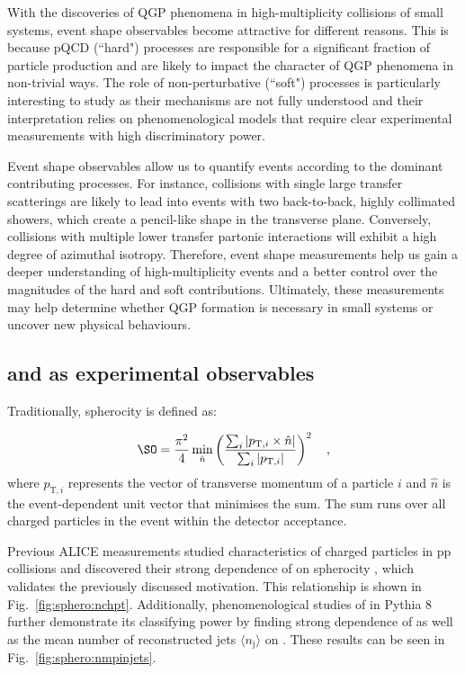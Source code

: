 With the discoveries of QGP phenomena in high-multiplicity collisions of small systems, event shape observables become attractive for different reasons. This is because pQCD (``hard") processes are responsible for a significant fraction of particle production and are likely to impact the character of QGP phenomena in non-trivial ways. The role of non-perturbative (``soft") processes is particularly interesting to study as their mechanisms are not fully understood and their interpretation relies on phenomenological models that require clear experimental measurements with high discriminatory power. 

Event shape observables allow us to quantify events according to the dominant contributing processes. For instance, collisions with single large \pt transfer scatterings are likely to lead into events with two back-to-back, highly collimated showers, which create a pencil-like shape in the transverse plane. Conversely, collisions with multiple lower \pt transfer partonic interactions will exhibit a high degree of azimuthal isotropy. Therefore, event shape measurements help us gain a deeper understanding of high-multiplicity events and a better control over the magnitudes of the hard and soft contributions. Ultimately, these measurements may help determine whether QGP formation is necessary in small systems or uncover new physical behaviours.

\subsection{\SO and \SOPT as experimental observables}

Traditionally, spherocity \SO is defined as:

\begin{align}
\SO = \frac{\pi^2}{4} \min_{\hat{n}} \left(\frac{\sum_i
      |p_{\textrm{T},i} \times \hat{n}|}{\sum_i
      |p_{\textrm{T},i}|}  \right)^2 \quad ,
\end{align}
where $p_{\textrm{T},i}$ represents the vector of transverse momentum of a particle $i$ and $\hat{n}$ is the event-dependent unit vector that minimises the sum. The sum runs over all charged particles in the event within the detector acceptance.

Previous ALICE measurements \cite{alicecollaborationChargedparticleProductionFunction2019} studied characteristics of charged particles in pp collisions and discovered their strong dependence of \meanpt on spherocity \SO, which validates the previously discussed motivation. This relationship is shown in Fig.~\ref{fig:sphero:nchpt}. Additionally, phenomenological studies of \SO in Pythia 8 further demonstrate its classifying power by finding strong dependence of \meannmpi as well as the mean number of reconstructed jets $\langle n_\mathrm{j} \rangle$ on \SO\cite{cuautleDisentanglingSoftHard2014, cuautleMidrapidityChargedHadron2015}. These results can be seen in Fig.~\ref{fig:sphero:nmpinjets}.

